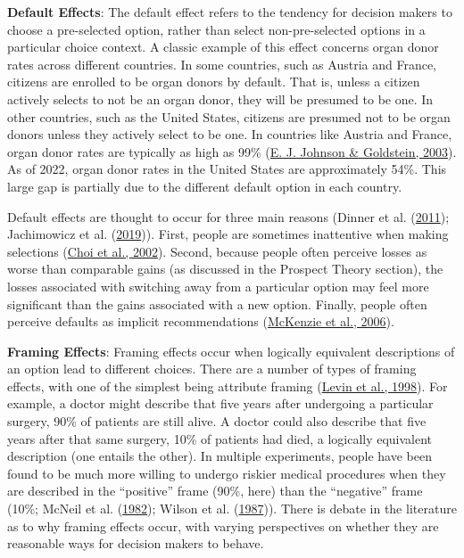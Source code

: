 \documentclass[
]{krantz}
\begin{document}
\textbf{Default Effects}: The default effect refers to the tendency for decision makers to choose a pre-selected option, rather than select non-pre-selected options in a particular choice context. A classic example of this effect concerns organ donor rates across different countries. In some countries, such as Austria and France, citizens are enrolled to be organ donors by default. That is, unless a citizen actively selects to not be an organ donor, they will be presumed to be one. In other countries, such as the United States, citizens are presumed not to be organ donors unless they actively select to be one. In countries like Austria and France, organ donor rates are typically as high as 99\% (\protect\hyperlink{ref-johnson2003defaults}{E. J. Johnson \& Goldstein, 2003}). As of 2022, organ donor rates in the United States are approximately 54\%. This large gap is partially due to the different default option in each country.

Default effects are thought to occur for three main reasons (Dinner et al. (\protect\hyperlink{ref-dinner2011partitioning}{2011}); Jachimowicz et al. (\protect\hyperlink{ref-jachimowicz2019and}{2019})). First, people are sometimes inattentive when making selections (\protect\hyperlink{ref-choi2002defined}{Choi et al., 2002}). Second, because people often perceive losses as worse than comparable gains (as discussed in the Prospect Theory section), the losses associated with switching away from a particular option may feel more significant than the gains associated with a new option. Finally, people often perceive defaults as implicit recommendations (\protect\hyperlink{ref-mckenzie2006recommendations}{McKenzie et al., 2006}).

\textbf{Framing Effects}: Framing effects occur when logically equivalent descriptions of an option lead to different choices. There are a number of types of framing effects, with one of the simplest being attribute framing (\protect\hyperlink{ref-levin1998all}{Levin et al., 1998}). For example, a doctor might describe that five years after undergoing a particular surgery, 90\% of patients are still alive. A doctor could also describe that five years after that same surgery, 10\% of patients had died, a logically equivalent description (one entails the other). In multiple experiments, people have been found to be much more willing to undergo riskier medical procedures when they are described in the ``positive'' frame (90\%, here) than the ``negative'' frame (10\%; McNeil et al. (\protect\hyperlink{ref-mcneil1982elicitation}{1982}); Wilson et al. (\protect\hyperlink{ref-wilson1987framing}{1987})). There is debate in the literature as to why framing effects occur, with varying perspectives on whether they are reasonable ways for decision makers to behave.
\end{document}
